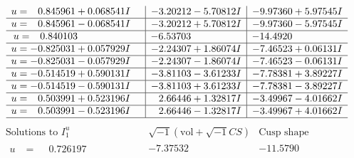 \documentclass[1p]{elsarticle_modified}
\theoremstyle{definition}
\newcommand{\I}{\sqrt{-1}}
\begin{document}
$$\begin{array}{c|c|c}
\begin{aligned}
u &= \phantom{-}0.845961 + 0.068541 I\end{aligned}
 & -3.20212 - 5.70812 I & -9.97360 + 5.97545 I \\ \hline\begin{aligned}
u &= \phantom{-}0.845961 - 0.068541 I\end{aligned}
 & -3.20212 + 5.70812 I & -9.97360 - 5.97545 I \\ \hline\begin{aligned}
u &= \phantom{-}0.840103\phantom{ +0.000000I}\end{aligned}
 & -6.53703\phantom{ +0.000000I} & -14.4920\phantom{ +0.000000I} \\ \hline\begin{aligned}
u &= -0.825031 + 0.057929 I\end{aligned}
 & -2.24307 + 1.86074 I & -7.46523 + 0.06131 I \\ \hline\begin{aligned}
u &= -0.825031 - 0.057929 I\end{aligned}
 & -2.24307 - 1.86074 I & -7.46523 - 0.06131 I \\ \hline\begin{aligned}
u &= -0.514519 + 0.590131 I\end{aligned}
 & -3.81103 - 3.61233 I & -7.78381 + 3.89227 I \\ \hline\begin{aligned}
u &= -0.514519 - 0.590131 I\end{aligned}
 & -3.81103 + 3.61233 I & -7.78381 - 3.89227 I \\ \hline\begin{aligned}
u &= \phantom{-}0.503991 + 0.523196 I\end{aligned}
 & \phantom{-}2.66446 + 1.32817 I & -3.49967 - 4.01662 I \\ \hline\begin{aligned}
u &= \phantom{-}0.503991 - 0.523196 I\end{aligned}
 & \phantom{-}2.66446 - 1.32817 I & -3.49967 + 4.01662 I\\
 \hline 
 \end{array}$$\newpage$$\begin{array}{c|c|c}  
\text{Solutions to }I^u_{1}& \I (\text{vol} + \sqrt{-1}CS) & \text{Cusp shape}\\
 \hline 
\begin{aligned}
u &= \phantom{-}0.726197\phantom{ +0.000000I}\end{aligned}
 & -7.37532\phantom{ +0.000000I} & -11.5790\phantom{ +0.000000I} \\ \hline\begin{aligned}

\end{aligned}
\end{array}$$
\end{document}
